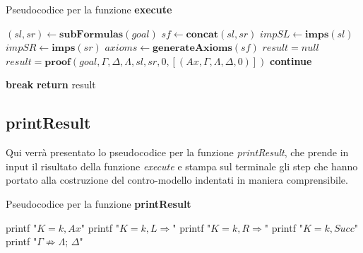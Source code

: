 \documentclass[\main/tesi.tex]{subfiles}
\begin{document}
\begin{algorithm}
    \caption{Pseudocodice per la funzione \textbf{execute}}\label{alg:execute}
    \begin{algorithmic}
        \State $(sl, sr) \gets \textbf{subFormulas}(goal)$
        \State $sf \gets \textbf{concat}(sl, sr)$
        \State $impSL \gets \textbf{imps}(sl)$
        \State $impSR \gets \textbf{imps}(sr)$
        \State $axioms \gets \textbf{generateAxioms}(sf)$
        \State $result = null$
        \State $result = \textbf{proof}(goal, \Gamma, \Delta, \Lambda, sl, sr, 0, [(Ax, \Gamma, \Lambda, \Delta, 0)])$
        \Else
        \State \textbf{continue}
        \EndIf

        \State \textbf{break}
        \EndIf
        \EndFor
        \State \textbf{return} result
        \EndFunction
    \end{algorithmic}
\end{algorithm}

\subsection{printResult}
Qui verrà presentato lo pseudocodice per la funzione \textit{printResult}, che prende in input il risultato della funzione \textit{execute} e stampa sul terminale gli step che hanno portato alla costruzione del contro-modello indentati in maniera comprensibile. \\

\begin{algorithm}
    \caption{Pseudocodice per la funzione \textbf{printResult}}\label{alg:printResult}
    \begin{algorithmic}
        \State printf "$K = k, Ax$"
        \State printf "$K = k, L\Rightarrow$"
        \State printf "$K = k, R\Rightarrow$"
        \State printf "$K = k, Succ$"
        \EndIf
        \State printf "$\Gamma \not\Rightarrow \Lambda$; $\Delta$"
        \EndFor
        \EndProcedure
    \end{algorithmic}
\end{algorithm}
\end{document}
